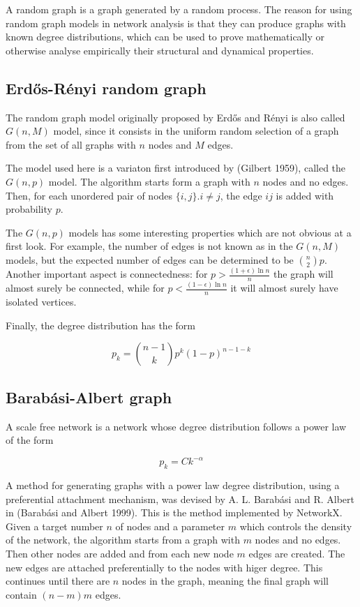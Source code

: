 \documentclass[oneside,openany]{memoir}
\begin{document}
A random graph is a graph generated by a random process. The reason for
using random graph models in network analysis is that they can produce
graphs with known degree distributions, which can be used to prove
mathematically or otherwise analyse empirically their structural and
dynamical properties.

\subsection{Erd\H{o}s-Rényi random
graph}\label{erds-ruxe9nyi-random-graph}

The random graph model originally proposed by Erd\H{o}s and Rényi is
also called $G(n,M)$ model, since it consists in the uniform random
selection of a graph from the set of all graphs with $n$ nodes and $M$
edges.

The model used here is a variaton first introduced by (Gilbert 1959),
called the $G(n,p)$ model. The algorithm starts form a graph with $n$
nodes and no edges. Then, for each unordered pair of nodes
$\{i,j\} . i \neq j$, the edge $ij$ is added with probability $p$.

The $G(n,p)$ models has some interesting properties which are not
obvious at a first look. For example, the number of edges is not known
as in the $G(n,M)$ models, but the expected number of edges can be
determined to be $\binom{n}{2}p$. Another important aspect is
connectedness: for $p > \frac{(1+\epsilon) \ln n}{n}$ the graph will
almost surely be connected, while for $p < \frac{(1-\epsilon) \ln n}{n}$
it will almost surely have isolated vertices.

Finally, the degree distribution has the form

\begin{equation}
p_k = \binom{n-1}{k} p^k (1-p)^{n-1-k}
\end{equation}

\subsection{Barabási-Albert graph}\label{barabuxe1si-albert-graph}

A scale free network is a network whose degree distribution follows a
power law of the form

\begin{equation}
p_k = Ck^{-\alpha}
\end{equation}

A method for generating graphs with a power law degree distribution,
using a preferential attachment mechanism, was devised by A. L. Barabási
and R. Albert in (Barabási and Albert 1999). This is the method
implemented by NetworkX. Given a target number $n$ of nodes and a
parameter $m$ which controls the density of the network, the algorithm
starts from a graph with $m$ nodes and no edges. Then other nodes are
added and from each new node $m$ edges are created. The new edges are
attached preferentially to the nodes with higer degree. This continues
until there are $n$ nodes in the graph, meaning the final graph will
contain $(n-m) m$ edges.
\end{document}
